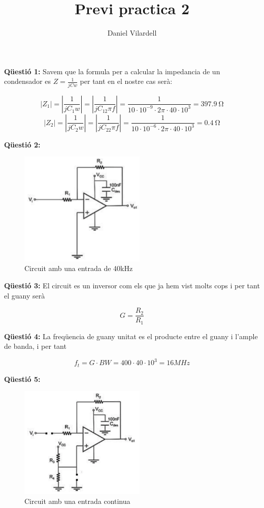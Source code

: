 \documentclass[12pt, a4papre]{article}
\author{Daniel Vilardell}
\title{Previ practica 2}
\date{}
\begin{document}
	\maketitle
	
	\textbf{Qüestió 1: }Savem que la formula per a calcular la impedancia de un condensador es $Z = \frac{1}{jCw}$ per tant en el nostre cas serà:
	
	\[
		|Z_1| = |\frac{1}{jC_1w}| =  |\frac{1}{jC_12\pi f}| = \frac{1}{10\cdot 10^{-9}\cdot 2\pi \cdot40 \cdot 10^{3}} =  \SI{397.9}{\ohm}
	\]
	\[
		|Z_2| = |\frac{1}{jC_2w}| =  |\frac{1}{jC_22\pi f}| = \frac{1}{10\cdot 10^{-6}\cdot 2\pi \cdot40 \cdot 10^{3}} =  \SI{0.4}{\ohm}
	\]
	
	\textbf{Qüestió 2: }
	\begin{figure}[H]
		\begin{center}
		\includegraphics[width=60mm]{previ2_2.png}
		\caption{Circuit amb una entrada de 40kHz}
		\end{center}
	\end{figure}
	
	\textbf{Qüestió 3: }El circuit es un inversor com els que ja hem vist molts cops i per tant el guany serà
	
	\[
		G = \frac{R_2}{R_1}
	\]
	
	\textbf{Qüestió 4: }La freqüencia de guany unitat es el producte entre el guany i l'ample de banda, i per tant
	
	\[
		f_t = G \cdot BW = 400 \cdot 40 \cdot 10^3 = 16MHz
	\]
	
	\textbf{Qüestió 5: } 
	\begin{figure}[H]
		\begin{center}
		\includegraphics[width=60mm]{previ2_5.png}
		\caption{Circuit amb una entrada continua}
		\end{center}
	\end{figure}
	
\end{document}
